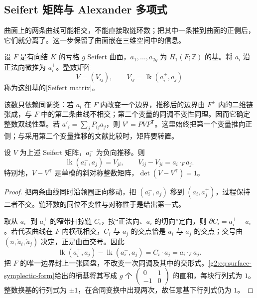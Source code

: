 \subsection{Seifert 矩阵与 Alexander 多项式}
\label{g2:subsec:A02:03}

曲面上的两条曲线可能相交，不能直接取链环数；把其中一条推到曲面的正侧后，它们就分离了。这一步保留了曲面嵌在三维空间中的信息。

\begin{definition}\label{g2:def:seifert-matrix}
	设 \(F\) 是有向结 \(K\) 的亏格 \(g\) Seifert 曲面，\(a_1,\ldots,a_{2g}\) 为 \(H_1(F;\mathbb Z)\) 的基。将 \(a_i\) 沿正法向微推为 \(a_i^+\)。整数矩阵
	\begin{equation}\label{g2:eq:seifert-matrix-convention}
		V=(V_{ij}),\qquad V_{ij}=\operatorname{lk}(a_i^+,a_j)
	\end{equation}
	称为这组基的[Seifert matrix]。
\end{definition}

该数只依赖同调类：若 \(a_i\) 在 \(F\) 内改变一个边界，推移后的边界由 \(F^+\) 内的二维链张成，与 \(F\) 中的第二条曲线不相交；第二个变量的同调不变性同理。因而它确定整数双线性型。若 \(a'_i=\sum_jP_{ij}a_j\)，则 \(V'=PVP^{\mathsf T}\)。这里始终把第一个变量推向正侧；与采用第二个变量推移的文献比较时，矩阵要转置。

\begin{proposition}\label{g2:prop:seifert-intersection}
	设 \(V\) 为上述 Seifert 矩阵，\(a_i^-\) 为负向推移。则
	\[
		\operatorname{lk}(a_i^-,a_j)=V_{ji},\qquad
		V_{ij}-V_{ji}=a_i\cdot_F a_j.
	\]
	特别地，\(V-V^{\mathsf T}\) 是单模的斜对称整数矩阵，\(\det(V-V^{\mathsf T})=1\)。
\end{proposition}
\begin{proof}
	把两条曲线同时沿领圈正向移动，把 \((a_i^-,a_j)\) 移到 \((a_i,a_j^+)\)，过程保持二者不交。链环数的同位不变性与对称性于是给出第一式。

	取从 \(a_i^-\) 到 \(a_i^+\) 的窄带扫掠链 \(C_i\)，按“正法向、\(a_i\) 的切向”定向，则 \(\partial C_i=a_i^+-a_i^-\)。若代表曲线在 \(F\) 内横截相交，\(C_i\) 与 \(a_j\) 的交点恰是 \(a_i\) 与 \(a_j\) 的交点；交号由 \((n,\dot a_i,\dot a_j)\) 决定，正是曲面交号。因此
	\[
		\operatorname{lk}(a_i^+,a_j)-\operatorname{lk}(a_i^-,a_j)
		=C_i\cdot a_j=a_i\cdot_F a_j.
	\]
	把 \(F\) 的唯一边界封上一张圆盘，不改变一次同调及其中的交形式。\cref{g2:eq:surface-symplectic-form}给出的柄基将其写成 \(g\) 个 \(\left(\begin{smallmatrix}0&1\\-1&0\end{smallmatrix}\right)\) 的直和，每块行列式为 \(1\)。整数换基的行列式为 \(\pm1\)，在合同变换中出现两次，故任意基下行列式仍为 \(1\)。
\end{proof}

